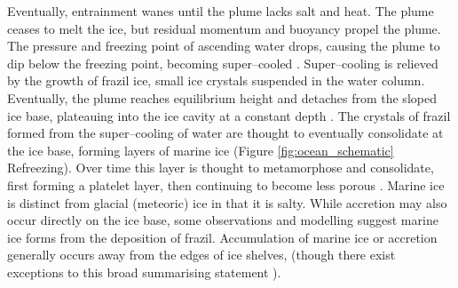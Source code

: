 Eventually, entrainment wanes until the plume lacks salt and heat. The plume ceases to melt the ice, but residual momentum and buoyancy propel the plume. The pressure and freezing point of ascending water drops, causing the plume to dip below the freezing point, becoming super--cooled \citep{holland2006effects}.  Super--cooling is relieved by the growth of frazil ice, small ice crystals suspended in the water column. Eventually, the plume reaches equilibrium height and detaches from the sloped ice base, plateauing into the ice cavity at a constant depth  \citep{hewitt2020subglacial}. 
The crystals of frazil formed from the super--cooling of water are thought to eventually consolidate at the ice base, forming layers of marine ice \cite[e.g.][]{fricker2001distribution} (Figure {\ref{fig:ocean_schematic}
} Refreezing).  Over time this layer is thought to metamorphose and consolidate, first forming  a platelet layer, then continuing to become less porous \citep{craven2009properties}. Marine ice is distinct from glacial (meteoric) ice in that it is salty. While accretion may also occur directly on the ice base, some observations \citep{vavnkova2021nature} and modelling \citep{bombosch1995modeling} suggest marine ice forms from the deposition of frazil.  Accumulation of marine ice or accretion generally occurs away from the edges of ice shelves, (though there exist exceptions to this broad summarising statement \cite[e.g.][]{langhorne2015observed}). 

